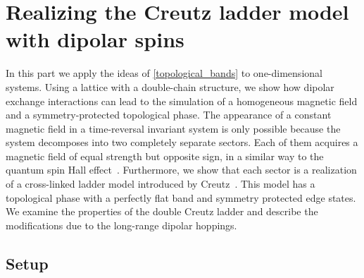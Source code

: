 \chapter[Realizing the Creutz ladder model with dipolar spins]{Realizing the Creutz ladder model\texorpdfstring{\\}{ }with dipolar spins}
\label{creutz_ladder}

In this part we apply the ideas of \cref{topological_bands} to one-dimensional systems.
Using a lattice with a double-chain structure, we show how dipolar exchange interactions can lead to the simulation of a homogeneous magnetic field and a symmetry-protected topological phase.
The appearance of a constant magnetic field in a time-reversal invariant system is only possible because the system decomposes into two completely separate sectors.
Each of them acquires a magnetic field of equal strength but opposite sign, in a similar way to the quantum spin Hall effect~\cite{Kane2005a}.
Furthermore, we show that each sector is a realization of a cross-linked ladder model introduced by Creutz~\cite{Creutz1999,Bermudez2009,Tovmasyan2013a,Takayoshi2013,Sticlet2014}.
This model has a topological phase with a perfectly flat band and symmetry protected edge states.
We examine the properties of the double Creutz ladder and describe the modifications due to the long-range dipolar hoppings.

\section{Setup}


